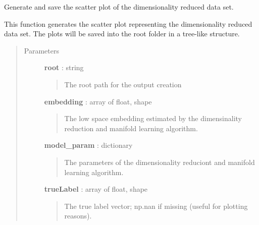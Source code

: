 \documentclass[letterpaper,10pt,english]{sphinxmanual}
\begin{document}
\label{index:module-adenine.core.analyze_results}

\begin{fulllineitems}
\label{index:adenine.core.analyze_results.make_scatter}
Generate and save the scatter plot of the dimensionality reduced data set.

This function generates the scatter plot representing the dimensionality reduced data set. The plots will be saved into the root folder in a tree-like structure.
\begin{quote}\begin{description}
\item[{Parameters}] \leavevmode
\textbf{root} : string
\begin{quote}

The root path for the output creation
\end{quote}

\textbf{embedding} : array of float, shape
\begin{quote}

The low space embedding estimated by the dimensinality reduction and manifold learning algorithm.
\end{quote}

\textbf{model\_param} : dictionary
\begin{quote}

The parameters of the dimensionality reduciont and manifold learning algorithm.
\end{quote}

\textbf{trueLabel} : array of float, shape
\begin{quote}

The true label vector; np.nan if missing (useful for plotting reasons).
\end{quote}

\end{description}\end{quote}

\end{fulllineitems}

\end{document}
